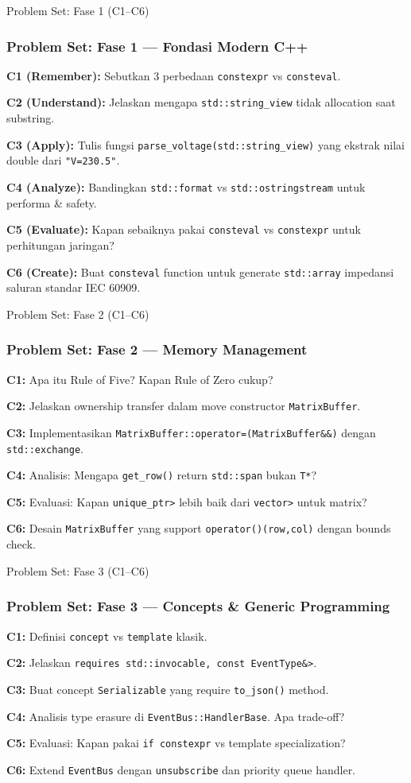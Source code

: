 \documentclass[aspectratio=169,10pt]{beamer}
\begin{document}
\begin{frame}[allowframebreaks]{Problem Set: Fase 1 (C1--C6)}
  \frametitle{Problem Set: Fase 1 — Fondasi Modern C++}
  
  \textbf{C1 (Remember):} Sebutkan 3 perbedaan \texttt{constexpr} vs \texttt{consteval}.
  
  \textbf{C2 (Understand):} Jelaskan mengapa \texttt{std::string\_view} tidak allocation saat substring.
  
  \textbf{C3 (Apply):} Tulis fungsi \texttt{parse\_voltage(std::string\_view)} yang ekstrak nilai double dari \texttt{"V=230.5"}.
  
  \textbf{C4 (Analyze):} Bandingkan \texttt{std::format} vs \texttt{std::ostringstream} untuk performa \& safety.
  
  \textbf{C5 (Evaluate):} Kapan sebaiknya pakai \texttt{consteval} vs \texttt{constexpr} untuk perhitungan jaringan?
  
  \textbf{C6 (Create):} Buat \texttt{consteval} function untuk generate \texttt{std::array} impedansi saluran standar IEC 60909.
\end{frame}

\begin{frame}[allowframebreaks]{Problem Set: Fase 2 (C1--C6)}
  \frametitle{Problem Set: Fase 2 — Memory Management}
  
  \textbf{C1:} Apa itu Rule of Five? Kapan Rule of Zero cukup?
  
  \textbf{C2:} Jelaskan ownership transfer dalam move constructor \texttt{MatrixBuffer}.
  
  \textbf{C3:} Implementasikan \texttt{MatrixBuffer::operator=(MatrixBuffer\&\&)} dengan \texttt{std::exchange}.
  
  \textbf{C4:} Analisis: Mengapa \texttt{get\_row()} return \texttt{std::span} bukan \texttt{T*}?
  
  \textbf{C5:} Evaluasi: Kapan \texttt{unique\_ptr\textlessT[]\textgreater} lebih baik dari \texttt{vector\textlessT\textgreater} untuk matrix?
  
  \textbf{C6:} Desain \texttt{MatrixBuffer} yang support \texttt{operator()(row,col)} dengan bounds check.
\end{frame}

\begin{frame}[allowframebreaks]{Problem Set: Fase 3 (C1--C6)}
  \frametitle{Problem Set: Fase 3 — Concepts \& Generic Programming}
  
  \textbf{C1:} Definisi \texttt{concept} vs \texttt{template} klasik.
  
  \textbf{C2:} Jelaskan \texttt{requires std::invocable\textlessFunc, const EventType\&\textgreater}.
  
  \textbf{C3:} Buat concept \texttt{Serializable} yang require \texttt{to\_json()} method.
  
  \textbf{C4:} Analisis type erasure di \texttt{EventBus::HandlerBase}. Apa trade-off?
  
  \textbf{C5:} Evaluasi: Kapan pakai \texttt{if constexpr} vs template specialization?
  
  \textbf{C6:} Extend \texttt{EventBus} dengan \texttt{unsubscribe} dan priority queue handler.
\end{frame}
\end{document}
